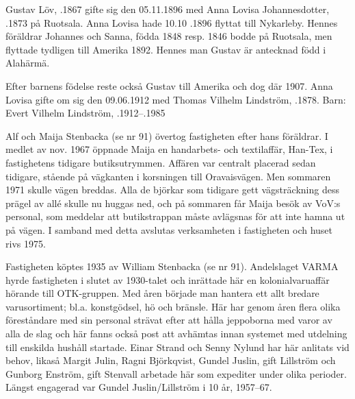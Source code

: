 Gustav Löv, .1867 gifte sig den 05.11.1896 med Anna Lovisa Johannesdotter, .1873 på Ruotsala. Anna Lovisa hade 10.10 .1896 flyttat till Nykarleby. Hennes föräldrar Johannes och Sanna, födda 1848 resp. 1846 bodde på Ruotsala, men flyttade tydligen till Amerika 1892. Hennes man Gustav är antecknad född i Alahärmä.
\begin{jhchildren}
  \item {}
  \item {}
  \item {}
  \item {}
\end{jhchildren}

Efter barnens födelse reste också Gustav till Amerika och dog där 1907. Anna Lovisa gifte om sig den 09.06.1912 med Thomas Vilhelm Lindström, .1878.
Barn: Evert Vilhelm Lindström, .1912--.1985






Alf och Maija Stenbacka (se nr 91) övertog fastigheten efter hans föräldrar. I medlet av nov. 1967 öppnade Maija en handarbets- och textilaffär, Han-Tex, i fastighetens tidigare butiksutrymmen. Affären var centralt placerad sedan tidigare, stående på vägkanten i korsningen till Oravaisvägen. Men sommaren 1971 skulle vägen breddas. Alla de björkar som tidigare gett vägsträckning dess prägel av allé skulle nu huggas ned, och på sommaren får Maija besök av VoV:s personal, som meddelar att butikstrappan måste avlägsnas för att inte hamna ut på vägen. I samband med detta avslutas verksamheten i fastigheten och huset rivs 1975.


Fastigheten köptes 1935 av William Stenbacka (se nr 91). Andelslaget VARMA hyrde fastigheten i slutet av 1930-talet och inrättade här en kolonialvaruaffär hörande till OTK-gruppen. Med åren började man hantera ett allt bredare varusortiment; bl.a. konstgödsel, hö och bränsle. Här har genom åren flera  olika föreståndare med sin personal strävat efter att hålla jeppoborna med varor av alla de slag och här fanns också post att avhämtas innan systemet med utdelning till enskilda hushåll startade. Einar Strand och Senny Nylund har här anlitats vid behov, likaså Margit Julin, Ragni Björkqvist, Gundel Juslin, gift Lillström och Gunborg Enström, gift Stenvall arbetade här som expediter under olika perioder. Längst engagerad var Gundel Juslin/Lillström i 10 år, 1957--67.

